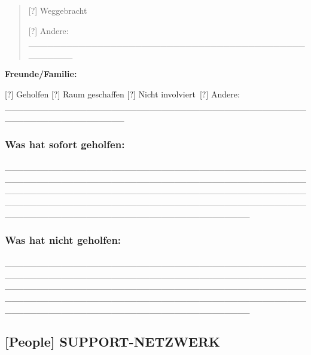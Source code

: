 \begin{quote}
[?] Weggebracht

[?] Andere: \_\_\_\_\_\_\_\_\_\_\_\_\_\_\_\_\_\_\_\_\_\_\_\_\_\_\_\_\_\_\_\_\_\_\_\_\_\_\_\_\_\_\_\_\_\_\_\_\_\_\_
\end{quote}

\textbf{Freunde/Familie:}

[?] Geholfen [?] Raum geschaffen [?] Nicht involviert\
[?] Andere: \_\_\_\_\_\_\_\_\_\_\_\_\_\_\_\_\_\_\_\_\_\_\_\_\_\_\_\_\_\_\_\_\_\_\_\_\_\_\_\_\_\_\_\_\_\_\_\_\_\_\_\_\_\_\_\_\_\_\_\_\_\_\_\_\_\_\_

\hypertarget{was-hat-sofort-geholfen}{%
\subsubsection{\texorpdfstring{\textbf{Was hat sofort geholfen:}}{Was hat sofort geholfen:}}\label{was-hat-sofort-geholfen}}

\_\_\_\_\_\_\_\_\_\_\_\_\_\_\_\_\_\_\_\_\_\_\_\_\_\_\_\_\_\_\_\_\_\_\_\_\_\_\_\_\_\_\_\_\_\_\_\_\_\_\_\_\_\_\_\_\_\_\_\_\_\_\_\_\_\_\_\_\_\_\_\_\_\_\_\_\_\_\_\_\_\_\_\_\_\_\_\_\_\_\_\_\_\_\_\_\_\_\_\_\_\_\_\_\_\_\_\_\_\_\_\_\_\_\_\_\_\_\_\_\_\_\_\_\_\_\_\_\_\_\_\_\_\_\_\_\_\_\_\_\_\_\_\_\_\_\_\_\_\_\_\_\_\_\_\_\_\_\_\_\_\_\_\_\_\_\_\_\_\_\_\_\_\_\_\_\_\_\_\_\_\_\_\_\_\_\_\_\_\_\_\_\_\_\_\_\_\_\_\_\_\_\_\_\_\_\_\_\_\_\_\_\_\_\_\_\_\_\_\_\_\_\_\_\_\_\_\_\_\_\_

\hypertarget{was-hat-nicht-geholfen}{%
\subsubsection{\texorpdfstring{\textbf{Was hat nicht geholfen:}}{Was hat nicht geholfen:}}\label{was-hat-nicht-geholfen}}

\_\_\_\_\_\_\_\_\_\_\_\_\_\_\_\_\_\_\_\_\_\_\_\_\_\_\_\_\_\_\_\_\_\_\_\_\_\_\_\_\_\_\_\_\_\_\_\_\_\_\_\_\_\_\_\_\_\_\_\_\_\_\_\_\_\_\_\_\_\_\_\_\_\_\_\_\_\_\_\_\_\_\_\_\_\_\_\_\_\_\_\_\_\_\_\_\_\_\_\_\_\_\_\_\_\_\_\_\_\_\_\_\_\_\_\_\_\_\_\_\_\_\_\_\_\_\_\_\_\_\_\_\_\_\_\_\_\_\_\_\_\_\_\_\_\_\_\_\_\_\_\_\_\_\_\_\_\_\_\_\_\_\_\_\_\_\_\_\_\_\_\_\_\_\_\_\_\_\_\_\_\_\_\_\_\_\_\_\_\_\_\_\_\_\_\_\_\_\_\_\_\_\_\_\_\_\_\_\_\_\_\_\_\_\_\_\_\_\_\_\_\_\_\_\_\_\_\_\_\_\_

\hypertarget{support-netzwerk}{%
\subsection{\texorpdfstring{\textbf{[People] SUPPORT-NETZWERK}}{[People] SUPPORT-NETZWERK}}\label{support-netzwerk}}

